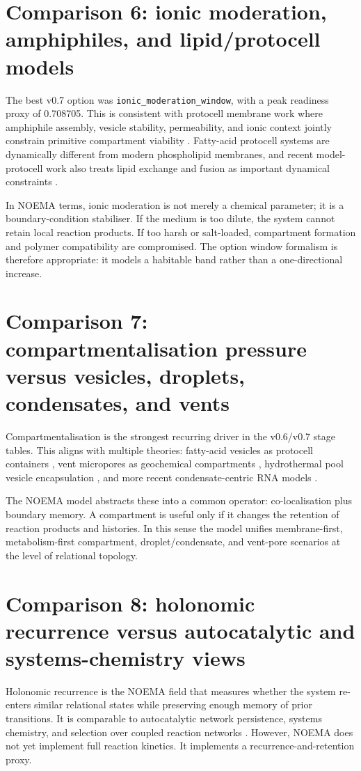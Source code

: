 \documentclass[11pt]{article}
\begin{document}
\section{Comparison 6: ionic moderation, amphiphiles, and lipid/protocell models}
The best v0.7 option was \texttt{ionic\_moderation\_window}, with a peak readiness proxy of 0.708705. This is consistent with protocell membrane work where amphiphile assembly, vesicle stability, permeability, and ionic context jointly constrain primitive compartment viability \cite{Mansy2008Protocells}. Fatty-acid protocell systems are dynamically different from modern phospholipid membranes, and recent model-protocell work also treats lipid exchange and fusion as important dynamical constraints \cite{Fan2023LipidExchange}.

In NOEMA terms, ionic moderation is not merely a chemical parameter; it is a boundary-condition stabiliser. If the medium is too dilute, the system cannot retain local reaction products. If too harsh or salt-loaded, compartment formation and polymer compatibility are compromised. The option window formalism is therefore appropriate: it models a habitable band rather than a one-directional increase.

\section{Comparison 7: compartmentalisation pressure versus vesicles, droplets, condensates, and vents}
Compartmentalisation is the strongest recurring driver in the v0.6/v0.7 stage tables. This aligns with multiple theories: fatty-acid vesicles as protocell containers \cite{Mansy2008Protocells}, vent micropores as geochemical compartments \cite{MartinRussell2003}, hydrothermal pool vesicle encapsulation \cite{DamerDeamer2015}, and more recent condensate-centric RNA models \cite{FineMoses2024Condensate}.

The NOEMA model abstracts these into a common operator: co-localisation plus boundary memory. A compartment is useful only if it changes the retention of reaction products and histories. In this sense the model unifies membrane-first, metabolism-first compartment, droplet/condensate, and vent-pore scenarios at the level of relational topology.

\section{Comparison 8: holonomic recurrence versus autocatalytic and systems-chemistry views}
Holonomic recurrence is the NOEMA field that measures whether the system re-enters similar relational states while preserving enough memory of prior transitions. It is comparable to autocatalytic network persistence, systems chemistry, and selection over coupled reaction networks \cite{Szostak2009,EigenSchuster1979}. However, NOEMA does not yet implement full reaction kinetics. It implements a recurrence-and-retention proxy.
\end{document}
